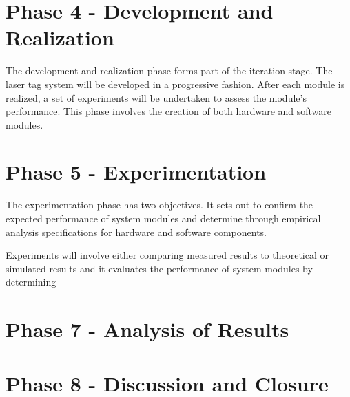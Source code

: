 
\section{Phase 4 - Development and Realization}

The development and realization phase forms part of the iteration stage. The laser tag system will be developed in a progressive fashion. After each module is realized, a set of experiments will be undertaken to assess the module's performance. This phase involves the creation of both hardware and software modules.

\section{Phase 5 - Experimentation}

The experimentation phase has two objectives. It sets out to confirm the expected performance of system modules and determine through empirical analysis specifications for hardware and software components.

Experiments will involve either comparing measured results to theoretical or simulated results and it evaluates the performance of system modules by determining 



\section{Phase 7 - Analysis of Results}



\section{Phase 8 - Discussion and Closure}








